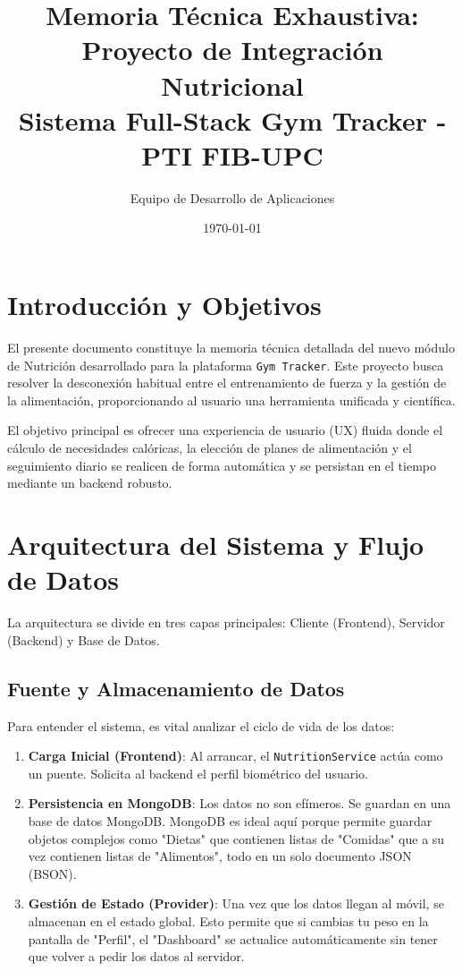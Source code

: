 \documentclass[12pt,a4paper]{article}
\title{Memoria Técnica Exhaustiva: Proyecto de Integración Nutricional \\ \large Sistema Full-Stack Gym Tracker - PTI FIB-UPC}
\author{Equipo de Desarrollo de Aplicaciones}
\date{\today}
\begin{document}
\maketitle
\newpage
\tableofcontents
\newpage

\section{Introducción y Objetivos}
El presente documento constituye la memoria técnica detallada del nuevo módulo de Nutrición desarrollado para la plataforma \texttt{Gym Tracker}. Este proyecto busca resolver la desconexión habitual entre el entrenamiento de fuerza y la gestión de la alimentación, proporcionando al usuario una herramienta unificada y científica.

El objetivo principal es ofrecer una experiencia de usuario (UX) fluida donde el cálculo de necesidades calóricas, la elección de planes de alimentación y el seguimiento diario se realicen de forma automática y se persistan en el tiempo mediante un backend robusto.

\section{Arquitectura del Sistema y Flujo de Datos}
La arquitectura se divide en tres capas principales: Cliente (Frontend), Servidor (Backend) y Base de Datos.

\subsection{Fuente y Almacenamiento de Datos}
Para entender el sistema, es vital analizar el ciclo de vida de los datos:
\begin{enumerate}
    \item \textbf{Carga Inicial (Frontend)}: Al arrancar, el \texttt{NutritionService} actúa como un puente. Solicita al backend el perfil biométrico del usuario.
    \item \textbf{Persistencia en MongoDB}: Los datos no son efímeros. Se guardan en una base de datos MongoDB. MongoDB es ideal aquí porque permite guardar objetos complejos como "Dietas" que contienen listas de "Comidas" que a su vez contienen listas de "Alimentos", todo en un solo documento JSON (BSON).
    \item \textbf{Gestión de Estado (Provider)}: Una vez que los datos llegan al móvil, se almacenan en el estado global. Esto permite que si cambias tu peso en la pantalla de "Perfil", el "Dashboard" se actualice automáticamente sin tener que volver a pedir los datos al servidor.
\end{enumerate}
\end{document}
